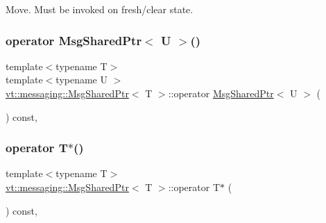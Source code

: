 Move. Must be invoked on fresh/clear state. 

\mbox{\label{structvt_1_1messaging_1_1_msg_shared_ptr_a984ff1a806b338a5fce6fc1861fd0198}} 
\subsubsection{\texorpdfstring{operator Msg\+Shared\+Ptr$<$ U $>$()}{operator MsgSharedPtr< U >()}}
{\footnotesize\ttfamily template$<$typename T$>$ \\
template$<$typename U $>$ \\
\hyperlink{structvt_1_1messaging_1_1_msg_shared_ptr}{vt\+::messaging\+::\+Msg\+Shared\+Ptr}$<$ T $>$\+::operator \hyperlink{structvt_1_1messaging_1_1_msg_shared_ptr}{Msg\+Shared\+Ptr}$<$ U $>$ (\begin{DoxyParamCaption}{ }\end{DoxyParamCaption}) const\hspace{0.3cm}{\ttfamily [inline]}, {\ttfamily [explicit]}}

\mbox{\label{structvt_1_1messaging_1_1_msg_shared_ptr_a85b58c8af4068d8cfd4ad2ebb02d8111}} 
\subsubsection{\texorpdfstring{operator T$\ast$()}{operator T*()}}
{\footnotesize\ttfamily template$<$typename T$>$ \\
\hyperlink{structvt_1_1messaging_1_1_msg_shared_ptr}{vt\+::messaging\+::\+Msg\+Shared\+Ptr}$<$ T $>$\+::operator T$\ast$ (\begin{DoxyParamCaption}{ }\end{DoxyParamCaption}) const\hspace{0.3cm}{\ttfamily [inline]}, {\ttfamily [explicit]}}

